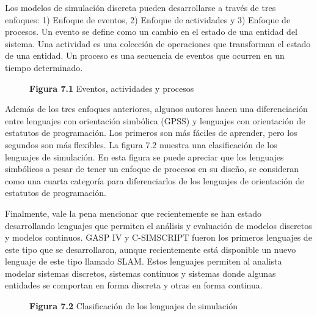 \documentclass[11pt,letterpaper]{report}
\begin{document}
Los modelos de simulación discreta pueden desarrollarse a través de tres
enfoques: 1) Enfoque de eventos, 2) Enfoque de actividades y 3) Enfoque
de procesos. Un evento se define como un cambio en el estado de una
entidad del sistema. Una actividad es una colección de operaciones que
transforman el estado de una entidad. Un proceso es una secuencia de
eventos que ocurren en un tiempo determinado.

\begin{figure}[H]
\centering
\caption*{\textbf{Figura 7.1} Eventos, actividades y procesos}
\end{figure}

Además de los tres enfoques anteriores, algunos autores hacen una
diferenciación entre lenguajes con orientación simbólica (GPSS) y
lenguajes con orientación de estatutos de programación. Los primeros son
más fáciles de aprender, pero los segundos son más flexibles. La figura
7.2 muestra una clasificación de los lenguajes de simulación. En esta
figura se puede apreciar que los lenguajes simbólicos a pesar de tener
un enfoque de procesos en su diseño, se consideran como una cuarta
categoría para diferenciarlos de los lenguajes de orientación de
estatutos de programación.

Finalmente, vale la pena mencionar que recientemente se han estado
desarrollando lenguajes que permiten el análisis y evaluación de modelos
discretos y modelos continuos. GASP IV y C-SIMSCRIPT fueron los primeros
lenguajes de este tipo que se desarrollaron, aunque recientemente está
disponible un nuevo lenguaje de este tipo llamado SLAM. Estos lenguajes
permiten al analista modelar sistemas discretos, sistemas continuos y
sistemas donde algunas entidades se comportan en forma discreta y otras
en forma continua.

\begin{figure}[H]
\centering
\caption*{\textbf{Figura 7.2} Clasificación de los lenguajes de simulación}
\end{figure}
\end{document}
